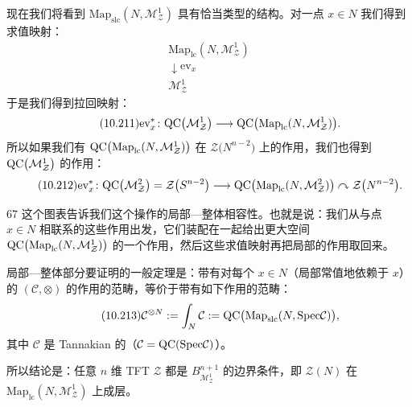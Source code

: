 现在我们将看到 $\mathrm{Map}_{\mathrm{slc}}(N,\mathcal{M}_{\mathcal{Z}}^{1})$ 具有恰当类型的结构。对一点 $x\in N$ 我们得到求值映射：
\begin{equation}\tag{10.210}
\begin{array}{c}
\mathrm{Map}_{\mathrm{lc}}(N,\mathcal{M}_{\mathcal{Z}}^{1})\\[2pt]
\downarrow{\scriptstyle \mathrm{ev}_x}\\[2pt]
\mathcal{M}_{\mathcal{Z}}^{1}
\end{array}
\end{equation}
于是我们得到拉回映射：
\begin{equation}\tag{10.211}
\mathrm{ev}_x^{*}\colon \mathrm{QC}\big(\mathcal{M}_{\mathcal{Z}}^{1}\big)\longrightarrow\mathrm{QC}\big(\mathrm{Map}_{\mathrm{lc}}(N,\mathcal{M}_{\mathcal{Z}}^{1})\big).
\end{equation}
所以如果我们有 $\mathrm{QC}\big(\mathrm{Map}_{\mathrm{lc}}(N,\mathcal{M}_{\mathcal{Z}}^{1})\big)$ 在 $\mathcal{Z}\big(N^{n-2}\big)$ 上的作用，我们也得到 $\mathrm{QC}\big(\mathcal{M}_{\mathcal{Z}}^{1}\big)$ 的作用：
\begin{equation}\tag{10.212}
\mathrm{ev}_x^{*}\colon \mathrm{QC}\big(\mathcal{M}_{\mathcal{Z}}^{2}\big)=\mathcal{Z}\big(S^{n-2}\big)\longrightarrow
\mathrm{QC}\big(\mathrm{Map}_{\mathrm{lc}}(N,\mathcal{M}_{\mathcal{Z}}^{2})\big)\curvearrowright\mathcal{Z}\big(N^{n-2}\big).
\end{equation}

\begin{srcrem}{67}
这个图表告诉我们这个操作的局部—整体相容性。也就是说：我们从与点 $x\in N$ 相联系的这些作用出发，它们装配在一起给出更大空间 $\mathrm{QC}\big(\mathrm{Map}_{\mathrm{lc}}(N,\mathcal{M}_{\mathcal{Z}}^{1})\big)$ 的一个作用，然后这些求值映射再把局部的作用取回来。
\end{srcrem}

局部—整体部分要证明的一般定理是：带有对每个 $x\in N$（局部常值地依赖于 $x$）的 $(\mathcal{C},\otimes)$ 的作用的范畴，等价于带有如下作用的范畴：
\begin{equation}\tag{10.213}
\mathcal{C}^{\otimes N}:=\int_N\mathcal{C}:=\mathrm{QC}\big(\mathrm{Map}_{\mathrm{slc}}(N,\mathrm{Spec}\mathcal{C})\big),
\end{equation}
其中 $\mathcal{C}$ 是 Tannakian 的（$\mathcal{C}=\mathrm{QC}(\mathrm{Spec}\mathcal{C})$）。

所以结论是：任意 $n$ 维 TFT $\mathcal{Z}$ 都是 $B_{\mathcal{M}_{\mathcal{Z}}^{1}}^{n+1}$ 的边界条件，即 $\mathcal{Z}(N)$ 在 $\mathrm{Map}_{\mathrm{lc}}(N,\mathcal{M}_{\mathcal{Z}}^{1})$ 上成层。

